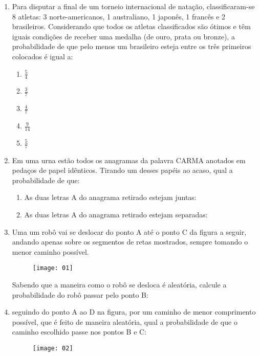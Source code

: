 \documentclass[twocolumn,oneside,a4paper,12pt]{article}
\begin{document}
\pagestyle{empty}
\cabecalho

\begin{enumerate}
\item Para  disputar  a  final  de  um  torneio  internacional  de natação,  classificaram-se  8  atletas:  3  norte-americanos,  1 australiano,    1    japonês,    1    francês    e    2    brasileiros. Considerando   que   todos   os   atletas   classificados   são ótimos  e  têm  iguais  condições  de  receber  uma  medalha (de  ouro,  prata  ou  bronze),  a  probabilidade  de  que  pelo menos   um   brasileiro   esteja   entre   os   três   primeiros colocados é igual a:
\begin{enumerate}
\item $\frac{5}{4}$
\item $\frac{3}{7}$
\item $\frac{4}{7}$
\item $\frac{9}{14}$
\item $\frac{5}{7}$
\end{enumerate}

\item Em uma urna estão todos os anagramas da palavra CARMA anotados em pedaços de papel idênticos. Tirando um desses papéis ao acaso, qual a probabilidade de que:
\begin{enumerate}
\item As duas letras A do anagrama retirado estejam juntas:
\item As duas letras A do anagrama retirado estejam separadas:
\end{enumerate}

\item Uma um robô vai se deslocar do ponto A até o ponto C da figura a seguir, andando apenas sobre os segmentos de retas mostrados, sempre tomando o menor caminho possível.

	\begin{figure}[!tbh]
	\center
	\texttt{[image: 01]}
	\end{figure}

Sabendo que a maneira como o robô se desloca é aleatória, calcule a probabilidade do robô passar pelo ponto B:

\item seguindo do ponto A ao D na figura, por um caminho de menor comprimento possível, que é feito de maneira aleatória, qual a probabilidade de que o caminho escolhido passe nos pontos B e C:

	\begin{figure}[!tbh]
	\center
	\texttt{[image: 02]}
	\end{figure}
	

\end{enumerate}
\end{document}
